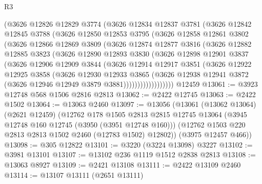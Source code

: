 \begin{lexlean}{R3}
\begin{coremodule}
        (@3626
          @12826
          @12829
          @3774
          (@3626
            @12834
            @12837
            @3781
            (@3626
              @12842
              @12845
              @3788
              (@3626
                @12850
                @12853
                @3795
                (@3626
                  @12858
                  @12861
                  @3802
                  (@3626
                    @12866
                    @12869
                    @3809
                    (@3626
                      @12874
                      @12877
                      @3816
                      (@3626
                        @12882
                        @12885
                        @3823
                        (@3626
                          @12890
                          @12893
                          @3830
                          (@3626
                            @12898
                            @12901
                            @3837
                            (@3626
                              @12906
                              @12909
                              @3844
                              (@3626
                                @12914
                                @12917
                                @3851
                                (@3626
                                  @12922
                                  @12925
                                  @3858
                                  (@3626
                                    @12930
                                    @12933
                                    @3865
                                    (@3626
                                      @12938
                                      @12941
                                      @3872
                                      (@3626 @12946 @12949 @3879 @3881))))))))))))))))))
    @12459
@13061 := @3923 @12748 @568 @1506 @2816 @2813
@13062 := @2422 @12745
@13063 := @2422 @1502
@13064 := @13063 @2460
@13097 := @13056
    (@13061
      (@13062 @13064)
      (@2621 @12459)
      (@12762
        @178
        @1505
        @2813
        @2815
        @12745
        @13064
        (@3945 @12748 @160 @12745 (@3950 (@3951 @12748 @160)))
        (@12762 @1503 @220 @2813 @2813 @1502 @2460 (@12783 @1502) @12802))
      (@3975 @12457 @466))
@13098 := @305 @12822
@13101 := @3220 (@3224 @13098) @3227
@13102 := @3981 @13101
@13107 := @13102 @236 @1119 @1512 @2838 @2813
@13108 := @13063 @8927
@13109 := @2421 @13108
@13111 := @2422 @13109 @2460
@13114 := @13107 @13111 (@2651 @13111)

\end{coremodule}
\end{lexlean}

